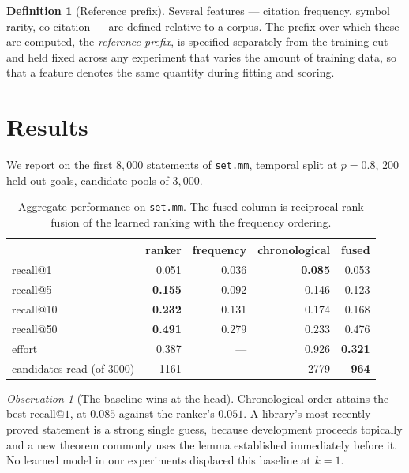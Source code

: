 \documentclass[11pt]{article}
\theoremstyle{plain}
\theoremstyle{definition}
\newtheorem{definition}[theorem]{Definition}
\theoremstyle{remark}
\newtheorem{observation}[theorem]{Observation}
\begin{document}
\begin{definition}[Reference prefix]\label{def:refcut}
Several features --- citation frequency, symbol rarity, co-citation --- are
defined relative to a corpus. The prefix over which these are computed, the
\emph{reference prefix}, is specified separately from the training cut and held
fixed across any experiment that varies the amount of training data, so that a
feature denotes the same quantity during fitting and scoring.
\end{definition}

\section{Results}\label{sec:results}

We report on the first $8{,}000$ statements of \texttt{set.mm}, temporal split at
$p=0.8$, $200$ held-out goals, candidate pools of $3{,}000$.

\begin{table}[htbp]\centering
\small
\begin{tabular}{@{}lrrrr@{}}
\toprule
& \textbf{ranker} & frequency & chronological & fused \\
\midrule
recall@1  & 0.051 & 0.036 & \textbf{0.085} & 0.053 \\
recall@5  & \textbf{0.155} & 0.092 & 0.146 & 0.123 \\
recall@10 & \textbf{0.232} & 0.131 & 0.174 & 0.168 \\
recall@50 & \textbf{0.491} & 0.279 & 0.233 & 0.476 \\
\midrule
effort & 0.387 & --- & 0.926 & \textbf{0.321} \\
candidates read (of 3000) & 1161 & --- & 2779 & \textbf{964} \\
\bottomrule
\end{tabular}
\caption{Aggregate performance on \texttt{set.mm}. The fused column is
reciprocal-rank fusion of the learned ranking with the frequency ordering.}
\label{tab:agg}
\end{table}

\begin{observation}[The baseline wins at the head]\label{obs:head}
Chronological order attains the best recall@$1$, at $0.085$ against the ranker's
$0.051$. A library's most recently proved statement is a strong single guess,
because development proceeds topically and a new theorem commonly uses the lemma
established immediately before it. No learned model in our experiments displaced
this baseline at $k=1$.
\end{observation}
\end{document}

